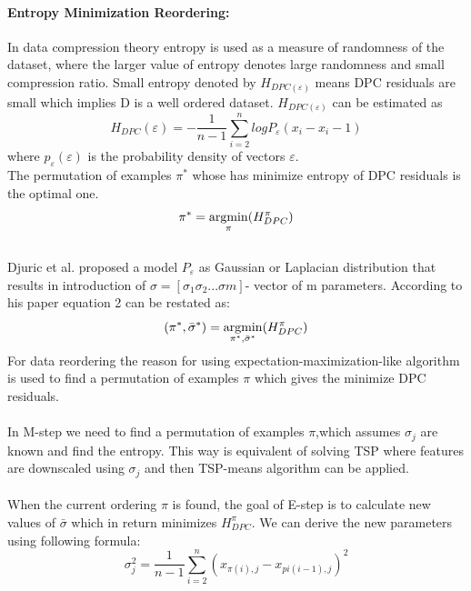 \paragraph{Entropy Minimization Reordering:}
In data compression theory entropy is used as a measure of randomness of the dataset, where the larger value of entropy denotes large randomness and small compression ratio. Small entropy denoted by $H_{DPC(\varepsilon)}$ means DPC residuals are small which implies D is a well ordered dataset. $H_{DPC(\varepsilon)}$ can be estimated as 
\begin{equation} \label{residuals}
H_{DPC}(\varepsilon) = - \frac{1}{n-1} \sum_{i=2}^{n} logP_\varepsilon(x_i-x_i-1)
\end{equation}
where $p_{\varepsilon} (\varepsilon)$ is the probability density of vectors $\varepsilon$.\\ 
The permutation of examples $\pi^*$ whose has minimize entropy of DPC residuals is the optimal one.
\begin{equation} \label{optimum_permutation}
\pi^* =\operatornamewithlimits{argmin}\limits_{{\pi}}(H^{\pi}_{DPC})
\end{equation}\\
Djuric et al. \cite{1thesis3} proposed a model $P_{\varepsilon}$ as Gaussian or Laplacian distribution that results in introduction of $\sigma = [\sigma_{1}\sigma_{2}...\sigma{m}]$- vector of m parameters. According to his paper equation 2 can be restated as:
\begin{equation}
(\pi^{*},\bar{\sigma}^{*}) = \operatornamewithlimits{argmin}\limits_{\pi^{*},\bar{\sigma}^{*}}(H^{\pi}_{DPC})
\end{equation}
For data reordering the reason for using expectation-maximization-like algorithm is used to find a permutation of examples $\pi$ which gives the minimize DPC residuals.\\\\
In M-step we need to find a permutation of examples $\pi$,which assumes $\sigma_j$ are known and find the entropy. This way is equivalent of solving TSP where features are downscaled using $\sigma_j$ and then TSP-means algorithm can be applied.\\\\
When the current ordering $\pi$ is found, the goal of E-step is to calculate new values of $\bar{\sigma}$ which in return minimizes $H^{\pi}_{DPC}$. We can derive the new parameters using following formula:
\begin{equation} \label{residuals}
\sigma_{j}^{2} = \frac{1}{n-1}\sum_{i=2}^{n}(x_{\pi(i),j}-x_{pi(i-1),j})^{2}
\end{equation}

